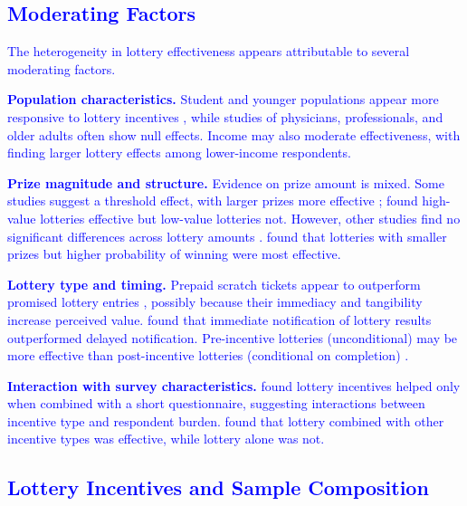 \documentclass[12pt]{article}
\begin{document}
\textcolor{blue}{\subsection{Moderating Factors}}

\textcolor{blue}{The heterogeneity in lottery effectiveness appears attributable to several moderating factors.}

\textcolor{blue}{\textbf{Population characteristics.} Student and younger populations appear more responsive to lottery incentives \citep{laguilles2011, larose2014, porter2003, martinson2000}, while studies of physicians, professionals, and older adults often show null effects. Income may also moderate effectiveness, with \citet{zhang2017} finding larger lottery effects among lower-income respondents.}

\textcolor{blue}{\textbf{Prize magnitude and structure.} Evidence on prize amount is mixed. Some studies suggest a threshold effect, with larger prizes more effective \citep[e.g.,][found \$200 helped but \$50-\$150 did not]{hubbard1988}; \citet{gajic2012} found high-value lotteries effective but low-value lotteries not. However, other studies find no significant differences across lottery amounts \citep{leung2002, halpern2011}. \citet{deutskens2004} found that lotteries with smaller prizes but higher probability of winning were most effective.}

\textcolor{blue}{\textbf{Lottery type and timing.} Prepaid scratch tickets appear to outperform promised lottery entries \citep{olsen2012, guo2016}, possibly because their immediacy and tangibility increase perceived value. \citet{tuten2004} found that immediate notification of lottery results outperformed delayed notification. Pre-incentive lotteries (unconditional) may be more effective than post-incentive lotteries (conditional on completion) \citep{sanchez-fernandez2010}.}

\textcolor{blue}{\textbf{Interaction with survey characteristics.} \citet{spry1989} found lottery incentives helped only when combined with a short questionnaire, suggesting interactions between incentive type and respondent burden. \citet{cobanoglu2003} found that lottery combined with other incentive types was effective, while lottery alone was not.}

\textcolor{blue}{\subsection{Lottery Incentives and Sample Composition}}
\end{document}
